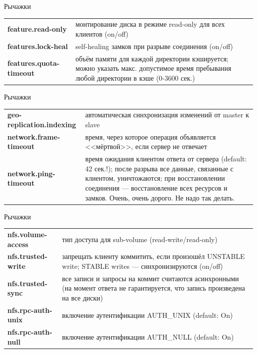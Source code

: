 \documentclass{beamer}
\begin{document}
\begin{frame}{Рычажки}
	\begin{block}{}
		\begin{tabular}{ p{6cm} p{5cm} }
			\textbf{feature.read-only} & монтирование диска в режиме read-only для всех клиентов (on/off)\\
			\textbf{features.lock-heal} & self-healing замков при разрыве соединения (on/off)\\
			\textbf{features.quota-timeout} & объём памяти для каждой директории кэшируется; можно указать макс. допустимое время пребывания любой директории в кэше (0-3600 сек.) \\
		\end{tabular}
	\end{block}
\end{frame}


\begin{frame}{Рычажки}
	\begin{block}{}
		\begin{tabular}{ p{6cm} p{5cm} }
			\textbf{geo-replication.indexing} & автоматическая синхронизация изменений от master к slave \\
			\textbf{network.frame-timeout} & время, через которое операция объявляется <<мёртвой>>, если сервер не отвечает \\ %
			\textbf{network.ping-timeout} & время ожидания клиентом ответа от сервера (default: 42 сек.!); после разрыва все данные, связанные с клиентом, уничтожаются; при восстановлении соединения --- восстановление всех ресурсов и замков. Очень, очень дорого. Не надо так делать. \\
		\end{tabular}
	\end{block}
\end{frame}

\begin{frame}{Рычажки}
	\begin{block}{}
		\begin{tabular}{ p{6cm} p{5cm} }
			\textbf{nfs.volume-access} & тип доступа для sub-volume (read-write/read-only) \\
			\textbf{nfs.trusted-write} & запрещать клиенту коммитить, если произошёл UNSTABLE write; STABLE writes --- синхронизируются (on/off) \\
			\textbf{nfs.trusted-sync} & все записи и запросы на коммит считаются асинхронными (на момент ответа не гарантируется, что запись произведена на все диски) \\
			\textbf{nfs.rpc-auth-unix} & включение аутентификации AUTH\_UNIX (default: On) \\
			\textbf{nfs.rpc-auth-null} & включение аутентификации AUTH\_NULL (default: On) \\
		\end{tabular}
	\end{block}
\end{frame}
\end{document}
